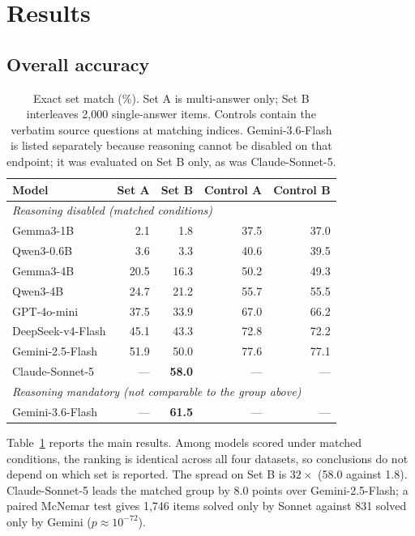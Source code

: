 \documentclass{article} %
\begin{document}
\section{Results}
\label{sec:results}

\subsection{Overall accuracy}

\begin{table}[t]
\caption{Exact set match (\%). Set A is multi-answer only; Set B interleaves 2,000
single-answer items. Controls contain the verbatim source questions at matching indices.
Gemini-3.6-Flash is listed separately because reasoning cannot be disabled on that
endpoint; it was evaluated on Set B only, as was Claude-Sonnet-5.}
\label{tab:main}
\begin{center}
\begin{small}
\begin{tabular}{lrrrr}
\toprule
\textbf{Model} & \textbf{Set A} & \textbf{Set B} & \textbf{Control A} & \textbf{Control B} \\
\midrule
\multicolumn{5}{l}{\emph{Reasoning disabled (matched conditions)}} \\
Gemma3-1B          &  2.1 &  1.8 & 37.5 & 37.0 \\
Qwen3-0.6B         &  3.6 &  3.3 & 40.6 & 39.5 \\
Gemma3-4B          & 20.5 & 16.3 & 50.2 & 49.3 \\
Qwen3-4B           & 24.7 & 21.2 & 55.7 & 55.5 \\
GPT-4o-mini        & 37.5 & 33.9 & 67.0 & 66.2 \\
DeepSeek-v4-Flash  & 45.1 & 43.3 & 72.8 & 72.2 \\
Gemini-2.5-Flash   & 51.9 & 50.0 & 77.6 & 77.1 \\
Claude-Sonnet-5    &  --- & \textbf{58.0} & --- & --- \\
\midrule
\multicolumn{5}{l}{\emph{Reasoning mandatory (not comparable to the group above)}} \\
Gemini-3.6-Flash   &  --- & \textbf{61.5} & --- & --- \\
\bottomrule
\end{tabular}
\end{small}
\end{center}
\end{table}

Table~\ref{tab:main} reports the main results. Among models scored under matched
conditions, the ranking is identical across all four datasets, so conclusions do not depend
on which set is reported. The spread on Set B is $32\times$ (58.0 against 1.8).
Claude-Sonnet-5 leads the matched group by 8.0 points over Gemini-2.5-Flash; a paired
McNemar test gives 1,746 items solved only by Sonnet against 831 solved only by Gemini
($p \approx 10^{-72}$).
\end{document}
